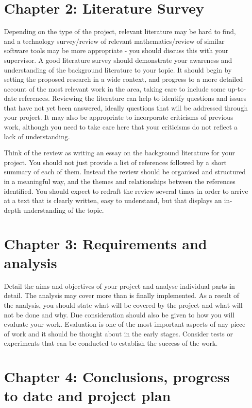 \documentclass{article}
\begin{document}
\section{Chapter 2: Literature Survey}

Depending on the type of the project, relevant literature may be hard to find, and a technology survey/review of relevant mathematics/review of similar software tools may be more appropriate - you should discuss this with your supervisor. 
A good literature survey should demonstrate your awareness and understanding of the background literature to your topic. 
It should begin by setting the proposed research in a wide context, and progress to a more detailed account of the most relevant work in the area, taking care to include some up-to-date references. Reviewing the literature can help to identify questions and issues that have not yet been answered, ideally questions that will be addressed through your project. It may also be appropriate to incorporate criticisms of previous work, although you need to take care here that your criticisms do not reflect a lack of understanding. 

Think of the review as writing an essay on the background literature for your project. 
You should not just provide a list of references followed by a short summary of each of them. Instead the review should be organised and structured in a meaningful way, and the themes and relationships between the references identified. 
You should expect to redraft the review several times in order to arrive at a text that is clearly written, easy to understand, but that displays an in-depth understanding of the topic. 

\section{Chapter 3: Requirements and analysis}

Detail the aims and objectives of your project and analyse individual parts in detail. 
The analysis may cover more than is finally implemented. As a result of the analysis, you should state what will be covered by the project and what will not be done and why. 
Due consideration should also be given to how you will evaluate your work. 
Evaluation is one of the most important aspects of any piece of work and it should be thought about in the early stages. 
Consider tests or experiments that can be conducted to establish the success of the work.


\section{Chapter 4: Conclusions, progress to date and project plan}
\end{document}
